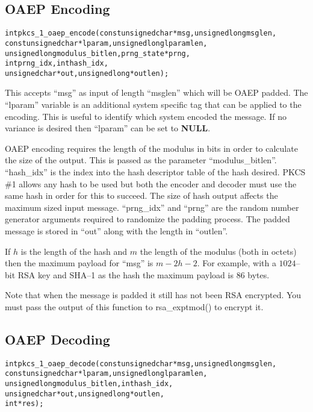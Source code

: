 \documentclass[a4paper]{book}
\begin{document}
\subsection{OAEP Encoding}

\begin{alltt}
int pkcs_1_oaep_encode(const unsigned char *msg,    unsigned long msglen,
                       const unsigned char *lparam, unsigned long lparamlen,
                             unsigned long modulus_bitlen, prng_state *prng,
                             int           prng_idx,         int  hash_idx,
                             unsigned char *out,    unsigned long *outlen);
\end{alltt}

This accepts ``msg'' as input of length ``msglen'' which will be OAEP padded.  The ``lparam'' variable is an additional system specific
tag that can be applied to the encoding.  This is useful to identify which system encoded the message.  If no variance is desired then
``lparam'' can be set to \textbf{NULL}.  

OAEP encoding requires the length of the modulus in bits in order to calculate the size of the output.  This is passed as the parameter
``modulus\_bitlen''.  ``hash\_idx'' is the index into the hash descriptor table of the hash desired.  PKCS \#1 allows any hash to be 
used but both the encoder and decoder must use the same hash in order for this to succeed.  The size of hash output affects the maximum
 sized input message.  ``prng\_idx'' and ``prng'' are the random number generator arguments required to randomize the padding process.  
The padded message is stored in ``out'' along with the length in ``outlen''.

If $h$ is the length of the hash and $m$ the length of the modulus (both in octets) then the maximum payload for ``msg'' is 
$m - 2h - 2$.  For example, with a $1024$--bit RSA key and SHA--1 as the hash the maximum payload is $86$ bytes.  

Note that when the message is padded it still has not been RSA encrypted.  You must pass the output of this function to 
rsa\_exptmod() to encrypt it. 

\subsection{OAEP Decoding}

\begin{alltt}
int pkcs_1_oaep_decode(const unsigned char *msg,    unsigned long msglen,
                       const unsigned char *lparam, unsigned long lparamlen,
                             unsigned long modulus_bitlen, int hash_idx,
                             unsigned char *out,    unsigned long *outlen,
                             int           *res);
\end{alltt}
\end{document}
